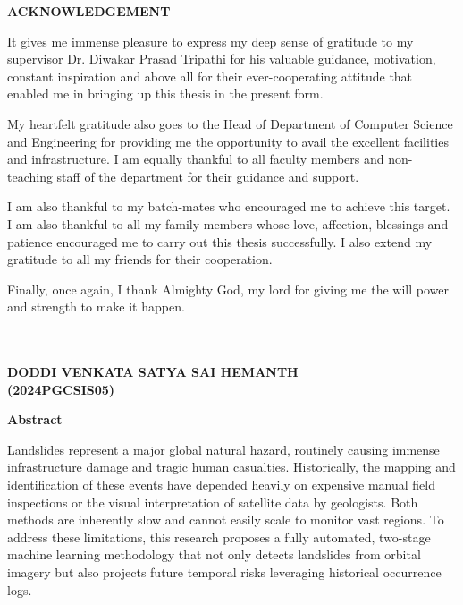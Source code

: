 \documentclass[12pt,a4paper]{report}
\begin{document}
\newpage
\thispagestyle{empty}
\begin{center}{\fontsize{16}{19.2}\selectfont\bfseries\color{black} ACKNOWLEDGEMENT}\end{center}
\vspace{5mm}
It gives me immense pleasure to express my deep sense of gratitude to my supervisor Dr. Diwakar Prasad Tripathi for his valuable guidance, motivation, constant inspiration and above all for their ever-cooperating attitude that enabled me in bringing up this thesis in the present form.

My heartfelt gratitude also goes to the Head of Department of Computer Science and Engineering for providing me the opportunity to avail the excellent facilities and infrastructure. I am equally thankful to all faculty members and non-teaching staff of the department for their guidance and support.

I am also thankful to my batch-mates who encouraged me to achieve this target. I am also thankful to all my family members whose love, affection, blessings and patience encouraged me to carry out this thesis successfully. I also extend my gratitude to all my friends for their cooperation.

Finally, once again, I thank Almighty God, my lord for giving me the will power and strength to make it happen.
\\
\\
\\
\begin{flushright} {\bf DODDI VENKATA SATYA SAI HEMANTH}\\{\bf (2024PGCSIS05)} \end{flushright}

\newpage
\thispagestyle{empty}
\begin{center}{\fontsize{16}{19.2}\selectfont\bfseries\color{thesisblue} Abstract}\end{center}
\vspace{5mm}
\noindent
Landslides represent a major global natural hazard, routinely causing immense infrastructure damage and tragic human casualties. Historically, the mapping and identification of these events have depended heavily on expensive manual field inspections or the visual interpretation of satellite data by geologists. Both methods are inherently slow and cannot easily scale to monitor vast regions. To address these limitations, this research proposes a fully automated, two-stage machine learning methodology that not only detects landslides from orbital imagery but also projects future temporal risks leveraging historical occurrence logs.
\end{document}
